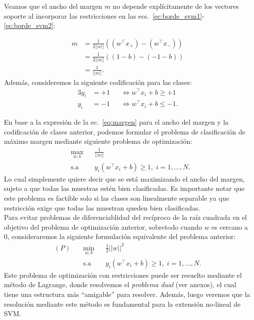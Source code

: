 Veamos que el ancho del margen $m$ no depende explícitamente de los vectores soporte al incorporar las restricciones en las ecs.~\eqref{ec:borde_svm1}-\eqref{ec:borde_svm2}:

\begin{align}
    m &= \frac{1}{2||w||} \left( (w^\top x_{+}) - (w^\top x_{-})\right)\nonumber\\
    &= \frac{1}{2||w||} \left((1-b) - (-1-b)\right)\nonumber\\
    &= \frac{1}{||w||}.\label{eq:margen}
\end{align}
Además, consideremos la siguiente codificación para las clases:
\begin{alignat}{3}
    y_i&=+1 &&\Leftrightarrow w^\top x_i + b \geq +1 \label{eq:codif_svm1}\\
    y_i &=-1 &&\Leftrightarrow w^\top x_i + b \leq -1.\label{eq:codif_svm2}
 \end{alignat}
 
En base a la expresión de la ec.~\eqref{eq:margen} para el ancho del margen y la codificación de clases anterior, podemos formular el problema de clasificación de máximo margen mediante  siguiente problema de optimización:
\begin{equation}
\begin{aligned}
& \underset{w,b}{\text{max}}
& & \frac{1}{||w||}\\
& \text{s.a}
& & y_i (w^\top x_i +b) \geq 1, \; i = 1, \ldots, N.
\end{aligned}
\end{equation}
Lo cual simplemente quiere decir que se está maximizando el ancho del margen, sujeto a que todas las muestras estén bien clasificadas. Es importante notar que este problema es factible solo si las clases son linealmente separable ya que restricción exige que todas las muestran queden bien clasificadas.\\

Para evitar problemas de diferenciablidad del recíproco de la raíz cuadrada en el objetivo del problema de optimización anterior, sobretodo cuando $w$ es cercano a 0, consideraremos la siguiente formulación equivalente del problema anterior:
\begin{equation}
\begin{aligned}
(P)\quad & \underset{w,b}{\min}
& & \frac{1}{2}||w||^2\\
& \text{s.a}
& & y_i (w^\top x_i +b) \geq 1, \; i = 1, \ldots, N.
\end{aligned}
\end{equation}
Este problema de optimización con restricciones puede ser resuelto mediante el método de Lagrange, donde resolvemos el \emph{problema dual} (ver anexos), el cual tiene una estructura más ``amigable'' para resolver. Además, luego veremos que la resolución mediante este método es fundamental para la extensión no-lineal de SVM.\\

